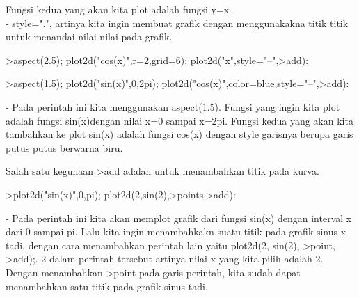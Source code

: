 \documentclass[a4paper,10pt]{article}
\begin{document}
\begin{eulernotebook}
\begin{eulercomment}
\begin{eulercomment}
\begin{eulercomment}
\begin{eulercomment}
\begin{eulercomment}
\begin{eulercomment}
\begin{eulercomment}
Fungsi kedua yang akan kita plot adalah fungsi y=x\\
- style=".", artinya kita ingin membuat grafik dengan menggunakakna
titik titik untuk menandai nilai-nilai pada grafik.
\end{eulercomment}
\begin{eulerprompt}
>aspect(2.5); plot2d("cos(x)",r=2,grid=6); plot2d("x",style="--",>add):
\end{eulerprompt}
\begin{eulerprompt}
>aspect(1.5); plot2d("sin(x)",0,2pi); plot2d("cos(x)",color=blue,style="--",>add):
\end{eulerprompt}
\begin{eulercomment}
- Pada perintah ini kita menggunakan aspect(1.5). Fungsi yang ingin
kita plot adalah fungsi sin(x)dengan nilai x=0 sampai x=2pi. Fungsi
kedua yang akan kita tambahkan ke plot sin(x) adalah fungsi cos(x)
dengan style garisnya berupa garis putus putus berwarna biru.

Salah satu kegunaan \textgreater{}add adalah untuk menambahkan titik pada kurva.
\end{eulercomment}
\begin{eulerprompt}
>plot2d("sin(x)",0,pi); plot2d(2,sin(2),>points,>add):
\end{eulerprompt}
\begin{eulercomment}
- Pada perintah ini kita akan memplot grafik dari fungsi sin(x) dengan
interval x dari 0 sampai pi. Lalu kita ingin menambahkakn suatu titik
pada grafik sinus x tadi, dengan cara menambahkan perintah lain yaitu
plot2d(2, sin(2), \textgreater{}point, \textgreater{}add);. 2 dalam perintah tersebut artinya
nilai x yang kita pilih adalah 2. Dengan menambahkan \textgreater{}point pada garis
perintah, kita sudah dapat menambahkan satu titik pada grafik sinus
tadi.


\end{eulercomment}
\end{eulercomment}
\end{eulercomment}
\end{eulercomment}
\end{eulercomment}
\end{eulercomment}
\end{eulercomment}
\end{eulernotebook}
\end{document}
